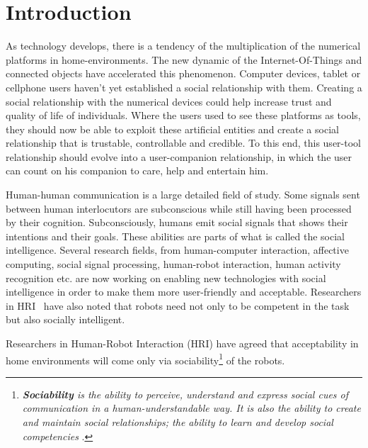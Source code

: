 \documentclass[a4paper,twocolumn]{svjour3}
\begin{document}
\section{Introduction}
\label{sec:introduction}
As technology develops, there is a tendency of the multiplication of the numerical platforms in home-environments. 
The new dynamic of the Internet-Of-Things and connected objects have accelerated this phenomenon. 
Computer devices, tablet or cellphone users haven't yet established a social relationship with them. 
Creating a social relationship with the numerical devices could help increase trust and quality of life of individuals.
Where the users used to see these platforms as tools, they should now be able to exploit these artificial entities and create a social relationship that is trustable, controllable and credible. 
To this end, this user-tool relationship should evolve into a user-companion relationship, in which the user can count on his companion to care, help and entertain him.

Human-human communication is a large detailed field of study. 
Some signals sent between human interlocutors are subconscious while still having been processed by their cognition.
Subconsciously, humans emit social signals that shows their intentions and their goals.
These abilities are parts of what is called the social intelligence.
Several research fields, from human-computer interaction, affective computing, social signal processing, human-robot interaction, human activity recognition etc. are now working on enabling new technologies with social intelligence in order to make them more user-friendly and acceptable.
Researchers in HRI~\cite{Tapus2007,Dautenhahn2007} have also noted that robots need not only to be competent in the task but also socially intelligent.

Researchers in Human-Robot Interaction (HRI) have agreed that acceptability in home environments will come only via sociability\footnote{\textit{\textbf{Sociability} is the ability to perceive, understand and express social cues of communication in a human-understandable way.
It is also the ability to create and maintain social relationships; the ability to learn and develop social competencies }\cite{Dautenhahn2007}.} of the robots.
\end{document}

